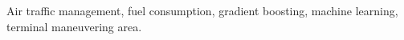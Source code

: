 \begin{IEEEkeywords}
Air traffic management, fuel consumption, gradient boosting, machine learning, terminal maneuvering area.
\end{IEEEkeywords}